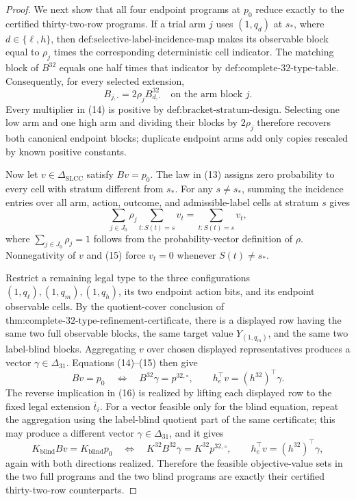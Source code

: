 \documentclass{article}
\begin{document}
\begin{proof}
We next show that all four endpoint programs at \(p_0\) reduce exactly to the certified thirty-two-row programs.  If a trial arm \(j\) uses \((1,q_d)\) at \(s_*\), where \(d\in\{\ell,h\}\), then \(\text{def:selective-label-incidence-map}\) makes its observable block equal to \(\rho_j\) times the corresponding deterministic cell indicator.  The matching block of \(B^{32}\) equals one half times that indicator by \(\text{def:complete-32-type-table}\).  Consequently, for every selected extension,
\[
 B_{j,\cdot}=2\rho_j B^{32}_{d,\cdot}
 \quad\text{on the arm block }j.
\tag{14}
\]
Every multiplier in (14) is positive by \(\text{def:bracket-stratum-design}\).  Selecting one low arm and one high arm and dividing their blocks by \(2\rho_j\) therefore recovers both canonical endpoint blocks; duplicate endpoint arms add only copies rescaled by known positive constants.

Now let \(v\in\Delta_{\mathrm{SLCC}}\) satisfy \(Bv=p_0\).  The law in (13) assigns zero probability to every cell with stratum different from \(s_*\).  For any \(s\neq s_*\), summing the incidence entries over all arm, action, outcome, and admissible-label cells at stratum \(s\) gives
\[
 \sum_{j\in J_0}\rho_j\sum_{t:S(t)=s}v_t
 =\sum_{t:S(t)=s}v_t,
\tag{15}
\]
where \(\sum_{j\in J_0}\rho_j=1\) follows from the probability-vector definition of \(\rho\).  Nonnegativity of \(v\) and (15) force \(v_t=0\) whenever \(S(t)\neq s_*\).

Restrict a remaining legal type to the three configurations \((1,q_\ell),(1,q_m),(1,q_h)\), its two endpoint action bits, and its endpoint observable cells.  By the quotient-cover conclusion of \(\text{thm:complete-32-type-refinement-certificate}\), there is a displayed row having the same two full observable blocks, the same target value \(Y_{(1,q_m)}\), and the same two label-blind blocks.  Aggregating \(v\) over chosen displayed representatives produces a vector \(\gamma\in\Delta_{31}\).  Equations (14)--(15) then give
\[
 Bv=p_0
 \quad\Longleftrightarrow\quad
 B^{32}\gamma=p^{32,\circ},
 \qquad
 h_e^{\top}v=(h^{32})^{\top}\gamma.
\tag{16}
\]
The reverse implication in (16) is realized by lifting each displayed row to the fixed legal extension \(\bar t_i\).  For a vector feasible only for the blind equation, repeat the aggregation using the label-blind quotient part of the same certificate; this may produce a different vector \(\gamma\in\Delta_{31}\), and it gives
\[
 K_{\mathrm{blind}}Bv=K_{\mathrm{blind}}p_0
 \quad\Longleftrightarrow\quad
 K^{32}B^{32}\gamma=K^{32}p^{32,\circ},
 \qquad
 h_e^{\top}v=(h^{32})^{\top}\gamma,
\tag{17}
\]
again with both directions realized.  Therefore the feasible objective-value sets in the two full programs and the two blind programs are exactly their certified thirty-two-row counterparts.


\end{proof}
\end{document}
